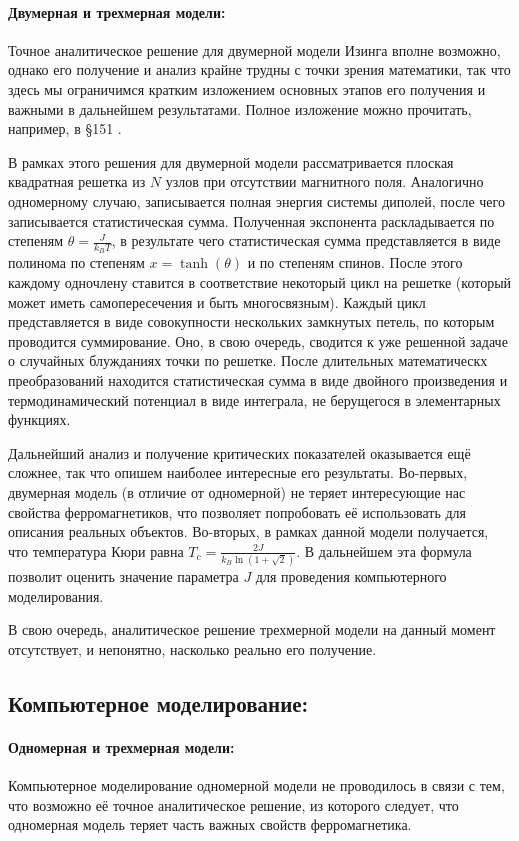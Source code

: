 \documentclass[oneside,final,14pt]{extarticle}
\begin{document}
	\paragraph{Двумерная и трехмерная модели:}
	Точное аналитическое решение для двумерной модели Изинга вполне возможно, однако его получение и анализ крайне трудны с точки зрения математики, так что здесь мы ограничимся кратким изложением основных этапов его получения и важными в дальнейшем результатами. Полное изложение можно прочитать, например, в \S 151 \cite{land5}.

	В рамках этого решения для двумерной модели рассматривается плоская квадратная решетка из $N$ узлов при отсутствии магнитного поля. Аналогично одномерному случаю, записывается полная энергия системы диполей, после чего записывается статистическая сумма. Полученная экспонента раскладывается по степеням $\theta = \frac{J}{k_{B}T}$, в результате чего статистическая сумма представляется в виде полинома по степеням $x=\tanh(\theta)$ и по степеням спинов. После этого каждому одночлену ставится в соответствие некоторый цикл на решетке (который может иметь самопересечения и быть многосвязным). Каждый цикл представляется в виде совокупности нескольких замкнутых петель, по которым проводится суммирование. Оно, в свою очередь, сводится к уже решенной задаче о случайных блужданиях точки по решетке. После длительных математическх преобразований находится статистическая сумма в виде двойного произведения и термодинамический потенциал в виде интеграла, не берущегося в элементарных функциях. 

	Дальнейший анализ и получение критических показателей оказывается ещё сложнее, так что опишем наиболее интересные его результаты. Во-первых, двумерная модель (в отличие от одномерной) не теряет интересующие нас свойства ферромагнетиков, что позволяет попробовать её использовать для описания реальных объектов. Во-вторых, в рамках данной модели получается, что температура Кюри равна $T_{c}=\frac{2J}{k_{B}\ln(1+\sqrt{2})}$. В дальнейшем эта формула позволит оценить значение параметра $J$ для проведения компьютерного моделирования. 

	В свою очередь, аналитическое решение трехмерной модели на данный момент отсутствует, и непонятно, насколько реально его получение. 
	\subsection{Компьютерное моделирование:}
	\paragraph{Одномерная и трехмерная модели:}
	Компьютерное моделирование одномерной модели не проводилось в связи с тем, что возможно её точное аналитическое решение, из которого следует, что одномерная модель теряет часть важных свойств ферромагнетика. 
\end{document}
